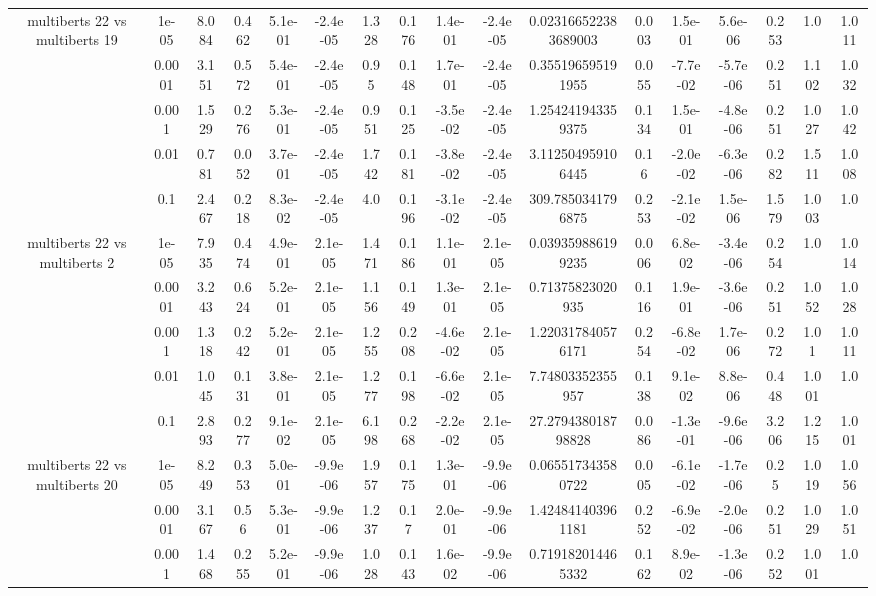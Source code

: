 \begin{tabular}{|c|c|c|c|c|c|c|c|c|c|c|c|c|c|c|c|c|}
\hline
\multirow{5}{*}{multiberts 22 vs multiberts 19} & 1e-05 & 8.084 & 0.462 & 5.1e-01 & -2.4e-05 & 1.328 & 0.176 & 1.4e-01 & -2.4e-05 & 0.023166522383689003 & 0.003 & 1.5e-01 & 5.6e-06 & 0.253 & 1.0 & 1.011 \\
 & 0.0001 & 3.151 & 0.572 & 5.4e-01 & -2.4e-05 & 0.95 & 0.148 & 1.7e-01 & -2.4e-05 & 0.355196595191955 & 0.055 & -7.7e-02 & -5.7e-06 & 0.251 & 1.102 & 1.032 \\
 & 0.001 & 1.529 & 0.276 & 5.3e-01 & -2.4e-05 & 0.951 & 0.125 & -3.5e-02 & -2.4e-05 & 1.254241943359375 & 0.134 & 1.5e-01 & -4.8e-06 & 0.251 & 1.027 & 1.042 \\
 & 0.01 & 0.781 & 0.052 & 3.7e-01 & -2.4e-05 & 1.742 & 0.181 & -3.8e-02 & -2.4e-05 & 3.112504959106445 & 0.16 & -2.0e-02 & -6.3e-06 & 0.282 & 1.511 & 1.008 \\
 & 0.1 & 2.467 & 0.218 & 8.3e-02 & -2.4e-05 & 4.0 & 0.196 & -3.1e-02 & -2.4e-05 & 309.7850341796875 & 0.253 & -2.1e-02 & 1.5e-06 & 1.579 & 1.003 & 1.0 \\
\hline
\multirow{5}{*}{multiberts 22 vs multiberts 2} & 1e-05 & 7.935 & 0.474 & 4.9e-01 & 2.1e-05 & 1.471 & 0.186 & 1.1e-01 & 2.1e-05 & 0.039359886199235 & 0.006 & 6.8e-02 & -3.4e-06 & 0.254 & 1.0 & 1.014 \\
 & 0.0001 & 3.243 & 0.624 & 5.2e-01 & 2.1e-05 & 1.156 & 0.149 & 1.3e-01 & 2.1e-05 & 0.71375823020935 & 0.116 & 1.9e-01 & -3.6e-06 & 0.251 & 1.052 & 1.028 \\
 & 0.001 & 1.318 & 0.242 & 5.2e-01 & 2.1e-05 & 1.255 & 0.208 & -4.6e-02 & 2.1e-05 & 1.220317840576171 & 0.254 & -6.8e-02 & 1.7e-06 & 0.272 & 1.01 & 1.011 \\
 & 0.01 & 1.045 & 0.131 & 3.8e-01 & 2.1e-05 & 1.277 & 0.198 & -6.6e-02 & 2.1e-05 & 7.74803352355957 & 0.138 & 9.1e-02 & 8.8e-06 & 0.448 & 1.001 & 1.0 \\
 & 0.1 & 2.893 & 0.277 & 9.1e-02 & 2.1e-05 & 6.198 & 0.268 & -2.2e-02 & 2.1e-05 & 27.279438018798828 & 0.086 & -1.3e-01 & -9.6e-06 & 3.206 & 1.215 & 1.001 \\
\hline
\multirow{5}{*}{multiberts 22 vs multiberts 20} & 1e-05 & 8.249 & 0.353 & 5.0e-01 & -9.9e-06 & 1.957 & 0.175 & 1.3e-01 & -9.9e-06 & 0.065517343580722 & 0.005 & -6.1e-02 & -1.7e-06 & 0.25 & 1.019 & 1.056 \\
 & 0.0001 & 3.167 & 0.56 & 5.3e-01 & -9.9e-06 & 1.237 & 0.17 & 2.0e-01 & -9.9e-06 & 1.424841403961181 & 0.252 & -6.9e-02 & -2.0e-06 & 0.251 & 1.029 & 1.051 \\
 & 0.001 & 1.468 & 0.255 & 5.2e-01 & -9.9e-06 & 1.028 & 0.143 & 1.6e-02 & -9.9e-06 & 0.719182014465332 & 0.162 & 8.9e-02 & -1.3e-06 & 0.252 & 1.001 & 1.0 \\

\end{tabular}
